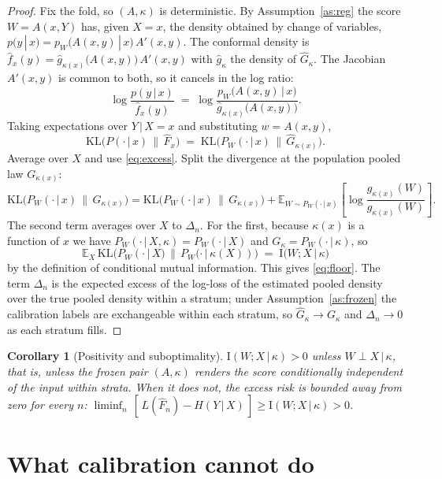 \documentclass[11pt]{article}
\newtheorem{corollary}[theorem]{Corollary}
\theoremstyle{definition}
\theoremstyle{remark}
\newcommand{\E}{\mathbb{E}}
\newcommand{\I}{\mathrm{I}}
\newcommand{\KL}{\mathrm{KL}}
\newcommand{\given}{\,|\,}
\begin{document}
\begin{proof}
Fix the fold, so $(A,\kappa)$ is deterministic. By Assumption~\ref{as:reg} the score
$W = A(x,Y)$ has, given $X=x$, the density obtained by change of variables,
$p(y\given x) = p_W\big(A(x,y)\given x\big)\, A'(x,y)$. The conformal density is
$\widehat f_x(y) = \widehat g_{\kappa(x)}\big(A(x,y)\big)\, A'(x,y)$ with $\widehat
g_\kappa$ the density of $\widehat G_\kappa$. The Jacobian $A'(x,y)$ is common to both,
so it cancels in the log ratio:
\[
  \log \frac{p(y\given x)}{\widehat f_x(y)}
  \;=\; \log \frac{p_W\big(A(x,y)\given x\big)}{\widehat g_{\kappa(x)}\big(A(x,y)\big)} .
\]
Taking expectations over $Y\given X=x$ and substituting $w = A(x,y)$,
\[
  \KL\big(P(\cdot\given x)\,\|\,\widehat F_x\big)
  \;=\; \KL\big(P_W(\cdot\given x)\,\|\,\widehat G_{\kappa(x)}\big) .
\]
Average over $X$ and use \eqref{eq:excess}. Split the divergence at the population
pooled law $G_{\kappa(x)}$:
\[
  \KL\big(P_W(\cdot\given x)\,\|\,\widehat G_{\kappa(x)}\big)
  = \KL\big(P_W(\cdot\given x)\,\|\,G_{\kappa(x)}\big)
    + \E_{W\sim P_W(\cdot\given x)}\!\left[\log \frac{g_{\kappa(x)}(W)}{\widehat g_{\kappa(x)}(W)}\right] .
\]
The second term averages over $X$ to $\Delta_n$. For the first, because
$\kappa(x)$ is a function of $x$ we have $P_W(\cdot\given X,\kappa)=P_W(\cdot\given X)$
and $G_{\kappa} = P_W(\cdot\given \kappa)$, so
\[
  \E_X\,\KL\big(P_W(\cdot\given X)\,\|\,P_W(\cdot\given \kappa(X))\big)
  \;=\; \I\big(W;X\given\kappa\big)
\]
by the definition of conditional mutual information. This gives \eqref{eq:floor}. The
term $\Delta_n$ is the expected excess of the log-loss of the estimated pooled density
over the true pooled density within a stratum; under Assumption~\ref{as:frozen} the
calibration labels are exchangeable within each stratum, so $\widehat G_\kappa \to
G_\kappa$ and $\Delta_n \to 0$ as each stratum fills.
\end{proof}

\begin{corollary}[Positivity and suboptimality]\label{cor:pos}
$\I(W;X\given\kappa) > 0$ unless $W \perp X \given \kappa$, that is, unless the frozen
pair $(A,\kappa)$ renders the score conditionally independent of the input within
strata. When it does not, the excess risk is bounded away from zero for every $n$:
$\liminf_n\,[\,L(\widehat F_n)-H(Y\given X)\,] \ge \I(W;X\given\kappa) > 0$.
\end{corollary}

\section{What calibration cannot do}
\end{document}
